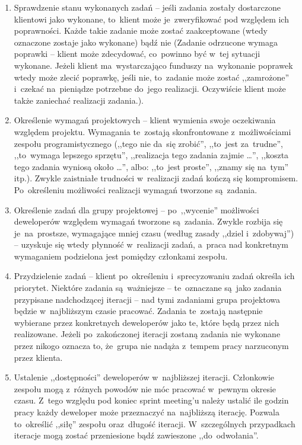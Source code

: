 \begin{enumerate}
  \item Sprawdzenie stanu wykonanych zadań -- jeśli zadania zostały dostarczone klientowi jako wykonane, to~klient może je~zweryfikować pod względem ich poprawności. Każde takie zadanie może zostać zaakceptowane (wtedy oznaczone zostaje jako wykonane) bądź nie (Zadanie odrzucone wymaga poprawki -- klient może zdecydować, co~powinno być w~tej sytuacji wykonane. Jeżeli klient ma~wystarczająco funduszy na~wykonanie poprawek wtedy może zlecić poprawkę, jeśli nie, to~zadanie może zostać ,,zamrożone'' i~czekać na~pieniądze potrzebne do~jego realizacji. Oczywiście klient może także zaniechać realizacji zadania.).
  \item Określenie wymagań projektowych -- klient wymienia swoje oczekiwania względem projektu. Wymagania te~zostają skonfrontowane z~możliwościami zespołu programistycznego (,,tego nie da~się zrobić'', ,,to~jest za~trudne'', ,,to~wymaga lepszego sprzętu'', ,,realizacja tego zadania zajmie \ldots'', ,,koszta tego zadania wyniosą około \ldots'', albo: ,,to~jest proste'', ,,znamy się na~tym'' itp.). Zwykle zaistniałe trudności w~realizacji zadań kończą się kompromisem. Po~określeniu możliwości realizacji wymagań tworzone są~zadania.
  \item Określenie zadań dla grupy projektowej -- po~,,wycenie'' możliwości deweloperów względem wymagań tworzone są~zadania. Zwykle rozbija się je~na~prostsze, wymagające mniej czasu (według zasady ,,dziel i~zdobywaj'') -- uzyskuje się wtedy płynność w~realizacji zadań, a~praca nad konkretnym wymaganiem podzielona jest pomiędzy członkami zespołu.
  \item Przydzielenie zadań -- klient po~określeniu i~sprecyzowaniu zadań określa ich priorytet. Niektóre zadania są~ważniejsze -- te~oznaczane są~jako zadania przypisane nadchodzącej iteracji -- nad tymi zadaniami grupa projektowa będzie w~najbliższym czasie pracować. Zadania te~zostają następnie wybierane przez konkretnych deweloperów jako te, które będą przez nich realizowane. Jeżeli po~zakończonej iteracji zostaną zadania nie wykonane przez nikogo oznacza to, że~grupa nie nadąża z~tempem pracy narzuconym przez klienta.
  \item Ustalenie ,,dostępności'' deweloperów w~najbliższej iteracji. Członkowie zespołu mogą z~różnych powodów nie móc pracować w~pewnym okresie czasu. Z~tego względu pod koniec sprint meeting'u należy ustalić ile godzin pracy każdy deweloper może przeznaczyć na~najbliższą iterację. Pozwala to~określić ,,siłę'' zespołu oraz~długość iteracji. W~szczególnych przypadkach iteracje mogą zostać przeniesione bądź zawieszone ,,do~odwołania''.
\end{enumerate}

